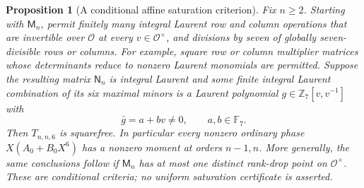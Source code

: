 \documentclass[11pt]{article}
\newtheorem{proposition}[lemma]{Proposition}
\begin{document}
\begin{proposition}[A conditional affine saturation criterion]
\label{prop:affine-saturation-criterion}
Fix $n\ge2$. Starting with $\mathsf M_n$, permit finitely many
integral Laurent row and column operations that are invertible
over $\mathcal O$ at every $v\in\mathcal O^\times$, and divisions by seven of
globally seven-divisible rows or columns.
For example, square row or column multiplier matrices whose
determinants reduce to nonzero Laurent monomials are permitted.
Suppose the resulting matrix $\mathsf N_n$ is integral Laurent
and some finite integral Laurent combination of its six maximal
minors is a Laurent polynomial $g\in\mathbb Z_7[v,v^{-1}]$ with
\[
 \bar g=a+bv\ne0,\qquad a,b\in\mathbb F_7.                  \tag{7}
\]
Then $T_{n,n,6}$ is squarefree. In particular every nonzero ordinary
phase $X(A_0+B_0X^6)$ has a nonzero moment at orders $n-1,n$.
More generally, the same conclusions follow if $\mathsf M_n$
has at most one distinct rank-drop point on $\mathcal O^\times$.
These are conditional criteria; no uniform saturation certificate
is asserted.
\end{proposition}
\end{document}
